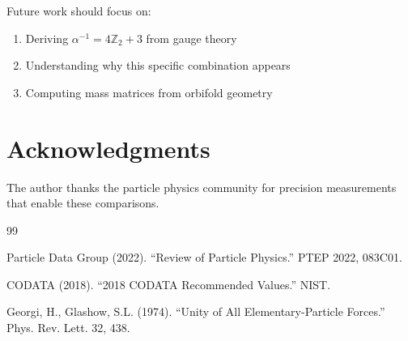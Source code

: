 \documentclass[12pt,a4paper]{article}
\begin{document}
Future work should focus on:
\begin{enumerate}
    \item Deriving $\alpha^{-1} = 4\mathbb{Z}_2 + 3$ from gauge theory
    \item Understanding why this specific combination appears
    \item Computing mass matrices from orbifold geometry
\end{enumerate}

\section*{Acknowledgments}

The author thanks the particle physics community for precision measurements that enable these comparisons.

\begin{thebibliography}{99}

Particle Data Group (2022). ``Review of Particle Physics.'' PTEP 2022, 083C01.

CODATA (2018). ``2018 CODATA Recommended Values.'' NIST.

Georgi, H., Glashow, S.L. (1974). ``Unity of All Elementary-Particle Forces.'' Phys. Rev. Lett. 32, 438.

\end{thebibliography}
\end{document}
